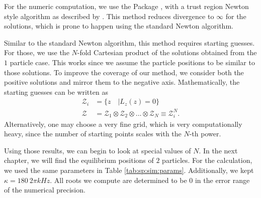 For the numeric computation, we use the Package ,
    with a trust region Newton style algorithm as described by \textcite{DennisJ.E1983Nmfu}. 
This method reduces divergence to $\infty$ for the solutions,
    which is prone to happen using the standard Newton algorithm.


Similar to the standard Newton algorithm, 
    this method requires starting guesses.
For those, we use the $N$-fold Cartesian product of the solutions obtained from the $1$ particle case.
This works since we assume the particle positions to be similar to those solutions.
To improve the coverage of our method,
    we consider both the positive solutions 
    and mirror them to the negative axis.
Mathematically, the starting guesses can be written as
\begin{align}
    \mathcal{Z}_i &=\{z\quad |L_z(z) = 0\} \\
    \mathcal{Z} &= \mathcal{Z}_1 \otimes \mathcal{Z}_2\otimes ... \otimes\mathcal{Z}_N\equiv \mathcal{Z}^N_i.
\end{align}
Alternatively, one may choose a very fine grid,
    which is very computationally heavy, 
    since the number of starting points scales with the $N$-th power.

Using those results, we can begin to look at special values of $N$. 
In the next chapter, we will find the equilibrium positions of $2$ particles.
For the calculation, we used the same parameters in Table \ref{tab:sp:sim:params}.
Additionally, we kept $\kappa = 180 ~2\pi \unit{kHz}$.
All roots we compute are determined to be $0$ in the error range of the numerical precision.